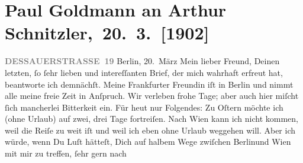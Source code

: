 

         
         \renewcommand{\erwaehntePersonen}{Personen: Richard Beer-Hofmann, Paul Goldmann, Theodore Rottenberg, Olga Schnitzler}
         \renewcommand{\erwaehnteInstitutionen}{Institutionen: Houghton Library}
         \renewcommand{\erwaehnteOrte}{Orte: Berlin, Dessauer Straße, Frankfurt am Main, Prag, Wien}
         \renewcommand{\erwaehnteWerke}{}
               \section[ Paul Goldmann an Arthur Schnitzler, 20. 3. {[}1902{]}]{ Paul Goldmann an Arthur Schnitzler, 20. 3. {[}1902{]}}\nopagebreak{}\rehead{ }\begin{ledgroupsized}[t]{13cm}\normalsize\beginnumbering \toendnotes[C]{\smallbreak\pagebreak[2]} 
\toendnotes[C]{\smallbreak}\pstart
           \noindent{}\raggedleft{}{\pb}\textcolor{gray}{\textbf{DESSAUERSTRASSE 19}}\pend
           \pstart
           Berlin, 20. März\pend
           \pstart{}Mein lieber Freund,\pend\pstart
           Deinen letzten, ſo ſehr lieben und intereſſanten Brief, der mich wahrhaft erfreut
               hat, beantworte ich demnächſt. Meine Frankfurter
                  Freundin iſt in Berlin und nimmt alle meine freie Zeit in Anſpruch. Wir
               verleben frohe Tage; aber auch hier miſcht ſich mancherlei Bitterkeit ein.\pend
           \pstart
           Für heut nur Folgendes: Zu Oſtern möchte ich (ohne
               Urlaub) auf zwei, drei Tage fortreiſen. Nach Wien
               kann ich nicht kommen, weil die Reiſe zu weit iſt und weil ich eben ohne Urlaub
               weggehen will. Aber ich würde, wenn Du Luſt hätteſt, Dich auf halbem Wege zwiſchen
                  Berlinund Wien mit mir
               zu treffen, ſehr gern nach \label{K_L03200-1v}
\end{ledgroupsized}
